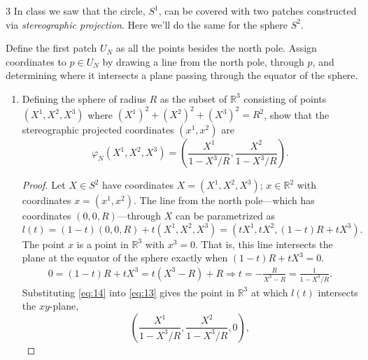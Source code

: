 \documentclass[11pt]{article}
\begin{document}
\begin{problem}{3}
	In class we saw that the circle, \( S^1 \), can be covered with two patches constructed via \textit{stereographic projection}.
	Here we'll do the same for the sphere \( S^2 \).

	Define the first patch \( U_N \) as all the points besides the north pole.
	Assign coordinates to \( p \in U_N \) by drawing a line from the north pole, through \( p \), and determining where it intersects a plane passing through the equator of the sphere.

	\begin{enumerate}[label=(\alph*)]
		\item Defining the sphere of radius \( R \) as the subset of \( \mathbb{R}^3 \) consisting of points \( (X^1, X^2, X^3) \) where \( (X^1)^2 + (X^2)^2 + (X^3)^2 = R^2 \), show that the stereographic projected coordinates \( (x^1, x^2) \) are
		      \begin{equation}
			      \label{eq:2}
			      \varphi_N(X^1, X^2, X^3) = \left( \frac{X^{1}}{1 - X^3/R}, \frac{X^2}{1 - X^3/R} \right).
		      \end{equation}
		      \begin{proof}
			      Let \( X \in S^2 \) have coordinates \( X = (X^1, X^2, X^3) \); \( x \in \mathbb{R}^2 \) with coordinates \( x = (x^1, x^2) \).
			      The line from the north pole---which has coordinates \( (0,0,R) \)---through \( X \) can be parametrized as
			      \begin{equation}
				      \label{eq:13}
				      l(t) = (1-t)(0,0,R) + t(X^1, X^2, X^3) = (tX^1, tX^2, (1-t)R + t X^3).
			      \end{equation}
			      The point \( x \) is a point in \( \mathbb{R}^3 \) with \( x^3 = 0 \).
			      That is, this line intersects the plane at the equator of the sphere exactly when \( (1-t)R + t X^3 = 0 \).
			      \begin{equation}
				      \label{eq:14}
				      \begin{aligned}
					      0 =  (1-t)R + t X^3 = t(X^3 - R) + R \Rightarrow t = -\frac{R}{X^3 - R} = \frac{1}{1 - X^3/R }.
				      \end{aligned}
			      \end{equation}
			      Substituting \cref{eq:14} into \cref{eq:13} gives the point in \( \mathbb{R}^3 \) at which \( l(t) \) intersects the \( xy \)-plane,
			      \begin{equation}
				      \label{eq:15}
				      \left(\frac{X^{1}}{1 - X^3/R}, \frac{X^2}{1- X^3/R}, 0\right),

\end{equation}
\end{proof}
\end{enumerate}
\end{problem}
\end{document}
